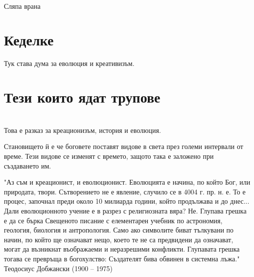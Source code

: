 \documentclass{article}
\begin{document}
{\huge Сляпа врана}
\section{Кеделке}
Тук става дума за еволюция и креативизъм.
\section{Тези които ядат трупове}



\section{}
Това е разказ за креационизъм, история и еволюция.

Становището й е че боговете поставят видове в света през големи интервали от време.
Тези видове се изменят с времето, защото така е заложено при създаването им.


"Аз съм и креационист, и еволюционист.
Еволюцията е начина, по който Бог, или природата, твори.
Сътворението не е явление, случило се в 4004 г. пр. н. е.
То е процес, започнал преди около 10 милиарда години, който продължава и до днес...
Дали еволюционното учение е в разрез с религиозната вяра?
Не.
Глупава грешка е да се бърка Свещеното писание с елементарен учебник по астрономия, геология, биология и антропология.
Само ако символите биват тълкувани по начин, по който ще означават нещо, което те не са предвидени да означават, могат да възникнат въображаеми и неразрешими конфликти.
Глупавата грешка тогава се превръща в богохулство: Създателят бива обвинен в системна лъжа."
 Теодосиус Добжански (1900 – 1975)
\end{document}

